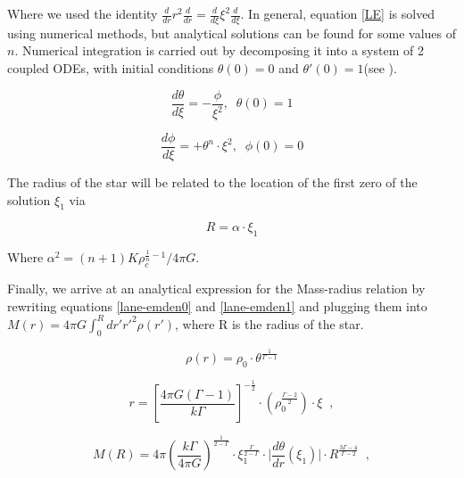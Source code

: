 Where we used the identity  $\frac{d}{dr} r^2 \frac{d}{dr} = \frac{d}{d\xi} \xi^2 \frac{d}{d\xi} $. In general, equation \ref{LE} is solved using numerical methods, but analytical solutions can be found for some values of $n$. Numerical integration is carried out by decomposing it into a system of 2 coupled ODEs, with initial conditions $\theta(0)=0$ and $\theta'(0)=1$(see \cite{Shapiro:1983du}).

\begin{equation}
\frac{d \theta}{d\xi} = -\frac{\phi}{\xi^2}, \;\; \theta(0)=1
\end{equation}

\begin{equation}
\frac{d \phi}{d\xi} = + \theta^n \cdot \xi^2, \;\; \phi(0)=0 
\end{equation}

The radius of the star will be related to the location of the first zero of the solution $\xi_1$ via 

\begin{equation}
R = \alpha \cdot \xi_1
\end{equation}

Where $\alpha^2=(n+1)K\rho_c^{\frac{1}{n}-1}/4\pi G$.


Finally, we arrive at an analytical expression for the Mass-radius relation by rewriting equations \ref{lane-emden0} and \ref{lane-emden1} and plugging them into $M(r) = 4\pi G \int_0^R dr' r'^2 \rho(r') $, where R is the radius of the star.

\begin{equation}\label{lane-emden2}
\rho(r) = \rho_0 \cdot \theta^{\frac{1}{\Gamma -1}} 
\end{equation}

\begin{equation}\label{lane-emden3}
r = \left[ \frac{4\pi G (\Gamma-1)}{k \Gamma} \right]^{-\frac{1}{2}} \cdot \left( \rho_0^{\frac{\Gamma-2}{2}} \right) \cdot \xi \;\; ,
\end{equation}

\begin{equation}\label{M-R}
M(R) = 4\pi \left( \frac{k \Gamma}{4\pi G} \right)^{\frac{1}{2-\Gamma}}\cdot \xi_1^{\frac{\Gamma}{2-\Gamma}} \cdot \Biggr| \frac{d\theta}{dr} (\xi_1) \Biggr| \cdot R^{\frac{3\Gamma -4}{\Gamma-2}} \;\; ,
\end{equation}


